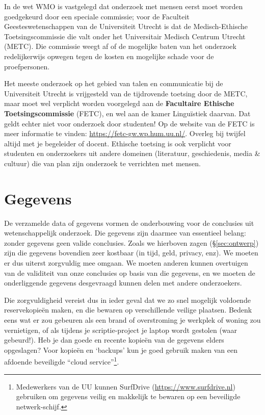 \documentclass[
]{book}
\begin{document}
In de wet WMO is vastgelegd dat onderzoek met mensen eerst moet worden
goedgekeurd door een speciale commissie; voor de Faculteit
Geesteswetenschappen van de Universiteit Utrecht is dat de
Medisch-Ethische Toetsingscommissie die valt onder het Universitair
Medisch Centrum Utrecht (METC). Die commissie weegt af of de mogelijke
baten van het onderzoek redelijkerwijs opwegen tegen de kosten en
mogelijke schade voor de proefpersonen.

Het meeste onderzoek op het gebied van talen en communicatie bij de
Universiteit Utrecht is vrijgesteld van de tijdrovende toetsing door de
METC, maar moet wel verplicht worden voorgelegd aan de \textbf{Facultaire
Ethische Toetsingscommissie} (FETC), en wel aan de kamer Linguïstiek
daarvan. Dat geldt echter niet voor onderzoek door studenten! Op de website
van de FETC is meer informatie te vinden:
\url{https://fetc-gw.wp.hum.uu.nl/}. Overleg bij twijfel altijd met je begeleider of docent.
Ethische toetsing is ook verplicht voor
studenten en onderzoekers uit andere domeinen (literatuur, geschiedenis,
media \& cultuur) die van plan zijn onderzoek te verrichten met mensen.

\hypertarget{gegevens}{%
\section{Gegevens}\label{gegevens}}

De verzamelde data of gegevens vormen de onderbouwing voor de conclusies
uit wetenschappelijk onderzoek. Die gegevens zijn daarmee van essentieel
belang: zonder gegevens geen valide conclusies. Zoals we hierboven zagen
(§\ref{sec:ontwerp})
zijn die gegevens bovendien zeer kostbaar (in tijd, geld, privacy, enz).
We moeten er dus uiterst zorgvuldig mee omgaan. We moeten anderen kunnen
overtuigen van de validiteit van onze conclusies op basis van die
gegevens, en we moeten de onderliggende gegevens desgevraagd kunnen
delen met andere onderzoekers.

Die zorgvuldigheid vereist dus in ieder geval dat we zo snel mogelijk
voldoende reservekopieën maken, en die bewaren op verschillende veilige
plaatsen. Bedenk eens wat er zou gebeuren als een brand of overstroming
je werkplek of woning zou vernietigen, of als tijdens je scriptie-project je laptop wordt gestolen (waar gebeurd!). Heb je dan goede en
recente kopieën van de gegevens elders opgeslagen? Voor kopieën en
`backups' kun je goed gebruik maken van een afdoende beveiligde ``cloud
service''\footnote{Medewerkers van de UU kunnen SurfDrive (\url{https://www.surfdrive.nl}) gebruiken om gegevens veilig en makkelijk te bewaren op een beveiligde netwerk-schijf.}.
\end{document}

